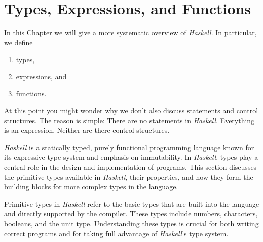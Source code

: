 \chapter{Types, Expressions, and Functions}
In this Chapter we will give a more systematic overview of \textsl{Haskell}.  In particular, we define
\begin{enumerate}
\item types, 
\item expressions, and
\item functions.
\end{enumerate}
At this point you might wonder why we don't also discuss statements and control structures.  The reason is
simple:  There are no statements in \textsl{Haskell}. Everything is an expression.  Neither are there control
structures. 

\textsl{Haskell} is a statically typed, purely functional programming language known for its expressive type
system and emphasis on immutability. In \textsl{Haskell}, types play a central role in the design and
implementation of programs. This section discusses the primitive types available in \textsl{Haskell}, their
properties, and how they form the building blocks for more complex types in the language. 

Primitive types in \textsl{Haskell} refer to the basic types that are built into the language and directly
supported by the compiler. These types include numbers, characters, booleans, and the unit type. Understanding
these types is crucial for both writing correct programs and for taking full advantage of \textsl{Haskell}'s
type system. 


